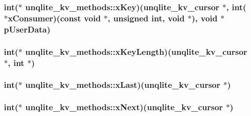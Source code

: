 \hypertarget{structunqlite__kv__methods_a3c35e9e3f75ba182847c7757164b3df1}{
\subsubsection[{x\-Key}]{\setlength{\rightskip}{0pt plus 5cm}int($\ast$ unqlite\-\_\-kv\-\_\-methods\-::x\-Key)({\bf unqlite\-\_\-kv\-\_\-cursor} $\ast$, int($\ast$x\-Consumer)(const void $\ast$, unsigned int, void $\ast$), void $\ast$p\-User\-Data)}}\label{d2/dfb/structunqlite__kv__methods_a3c35e9e3f75ba182847c7757164b3df1}
\hypertarget{structunqlite__kv__methods_ae280fe876217defc8fcdfc6c260c9620}{
\subsubsection[{x\-Key\-Length}]{\setlength{\rightskip}{0pt plus 5cm}int($\ast$ unqlite\-\_\-kv\-\_\-methods\-::x\-Key\-Length)({\bf unqlite\-\_\-kv\-\_\-cursor} $\ast$, int $\ast$)}}\label{d2/dfb/structunqlite__kv__methods_ae280fe876217defc8fcdfc6c260c9620}
\hypertarget{structunqlite__kv__methods_a4cf12f1965c2442575cb226397c3545c}{
\subsubsection[{x\-Last}]{\setlength{\rightskip}{0pt plus 5cm}int($\ast$ unqlite\-\_\-kv\-\_\-methods\-::x\-Last)({\bf unqlite\-\_\-kv\-\_\-cursor} $\ast$)}}\label{d2/dfb/structunqlite__kv__methods_a4cf12f1965c2442575cb226397c3545c}
\hypertarget{structunqlite__kv__methods_ae177efc5e24a54891754ef2994786228}{
\subsubsection[{x\-Next}]{\setlength{\rightskip}{0pt plus 5cm}int($\ast$ unqlite\-\_\-kv\-\_\-methods\-::x\-Next)({\bf unqlite\-\_\-kv\-\_\-cursor} $\ast$)}}\label{d2/dfb/structunqlite__kv__methods_ae177efc5e24a54891754ef2994786228}
